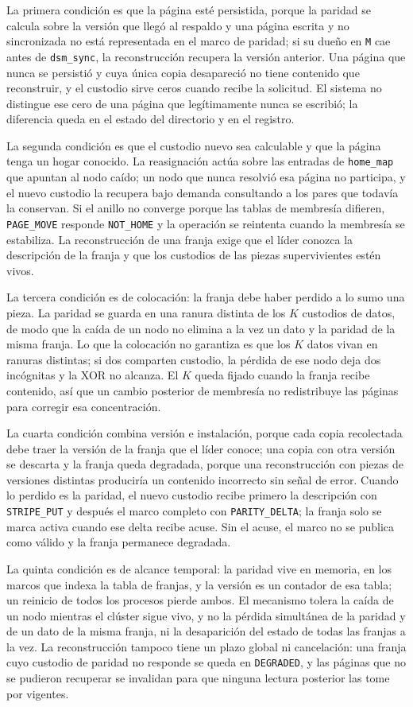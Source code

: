 La primera condición es que la página esté persistida, porque la paridad se calcula sobre la versión que llegó al respaldo y una página escrita y no sincronizada no está representada en el marco de paridad; si su dueño en \texttt{M} cae antes de \texttt{dsm\_sync}, la reconstrucción recupera la versión anterior. Una página que nunca se persistió y cuya única copia desapareció no tiene contenido que reconstruir, y el custodio sirve ceros cuando recibe la solicitud. El sistema no distingue ese cero de una página que legítimamente nunca se escribió; la diferencia queda en el estado del directorio y en el registro.

La segunda condición es que el custodio nuevo sea calculable y que la página tenga un hogar conocido. La reasignación actúa sobre las entradas de \texttt{home\_map} que apuntan al nodo caído; un nodo que nunca resolvió esa página no participa, y el nuevo custodio la recupera bajo demanda consultando a los pares que todavía la conservan. Si el anillo no converge porque las tablas de membresía difieren, \texttt{PAGE\_MOVE} responde \texttt{NOT\_HOME} y la operación se reintenta cuando la membresía se estabiliza. La reconstrucción de una franja exige que el líder conozca la descripción de la franja y que los custodios de las piezas supervivientes estén vivos.

La tercera condición es de colocación: la franja debe haber perdido a lo sumo una pieza. La paridad se guarda en una ranura distinta de los $K$ custodios de datos, de modo que la caída de un nodo no elimina a la vez un dato y la paridad de la misma franja. Lo que la colocación no garantiza es que los $K$ datos vivan en ranuras distintas; si dos comparten custodio, la pérdida de ese nodo deja dos incógnitas y la XOR no alcanza. El $K$ queda fijado cuando la franja recibe contenido, así que un cambio posterior de membresía no redistribuye las páginas para corregir esa concentración.

La cuarta condición combina versión e instalación, porque cada copia recolectada debe traer la versión de la franja que el líder conoce; una copia con otra versión se descarta y la franja queda degradada, porque una reconstrucción con piezas de versiones distintas produciría un contenido incorrecto sin señal de error. Cuando lo perdido es la paridad, el nuevo custodio recibe primero la descripción con \texttt{STRIPE\_PUT} y después el marco completo con \texttt{PARITY\_DELTA}; la franja solo se marca activa cuando ese delta recibe acuse. Sin el acuse, el marco no se publica como válido y la franja permanece degradada.

La quinta condición es de alcance temporal: la paridad vive en memoria, en los marcos que indexa la tabla de franjas, y la versión es un contador de esa tabla; un reinicio de todos los procesos pierde ambos. El mecanismo tolera la caída de un nodo mientras el clúster sigue vivo, y no la pérdida simultánea de la paridad y de un dato de la misma franja, ni la desaparición del estado de todas las franjas a la vez. La reconstrucción tampoco tiene un plazo global ni cancelación: una franja cuyo custodio de paridad no responde se queda en \texttt{DEGRADED}, y las páginas que no se pudieron recuperar se invalidan para que ninguna lectura posterior las tome por vigentes.
